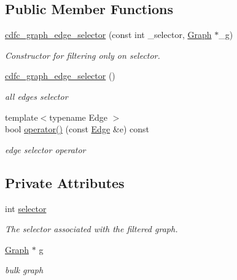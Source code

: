 \subsection*{Public Member Functions}
\begin{DoxyCompactItemize}
\item 
\hyperlink{structcdfc__graph__edge__selector_ad8bf285670465492140703ab95431789}{cdfc\+\_\+graph\+\_\+edge\+\_\+selector} (const int \+\_\+selector, \hyperlink{structGraph}{Graph} $\ast$\+\_\+g)
\begin{DoxyCompactList}\small\item\em Constructor for filtering only on selector. \end{DoxyCompactList}\item 
\hyperlink{structcdfc__graph__edge__selector_a50d53f893681b6d7e51dae085eddc2af}{cdfc\+\_\+graph\+\_\+edge\+\_\+selector} ()
\begin{DoxyCompactList}\small\item\em all edges selector \end{DoxyCompactList}\item 
{\footnotesize template$<$typename Edge $>$ }\\bool \hyperlink{structcdfc__graph__edge__selector_a121b4f305b4bb3ca39a627d4f6666145}{operator()} (const \hyperlink{structEdge}{Edge} \&e) const
\begin{DoxyCompactList}\small\item\em edge selector operator \end{DoxyCompactList}\end{DoxyCompactItemize}
\subsection*{Private Attributes}
\begin{DoxyCompactItemize}
\item 
int \hyperlink{structcdfc__graph__edge__selector_a6e55afea9cbe8e297f587797731148a7}{selector}
\begin{DoxyCompactList}\small\item\em The selector associated with the filtered graph. \end{DoxyCompactList}\item 
\hyperlink{structGraph}{Graph} $\ast$ \hyperlink{structcdfc__graph__edge__selector_a08e72b11aa618c9df03a160be17d796a}{g}
\begin{DoxyCompactList}\small\item\em bulk graph \end{DoxyCompactList}\end{DoxyCompactItemize}


